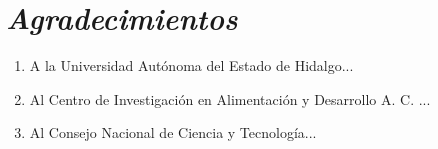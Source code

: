 \newpage
\pagestyle{empty} %

\thispagestyle{empty}

\section*{\centering \huge \it Agradecimientos}
\bigskip

\begin{enumerate}
	\item A la Universidad Autónoma del Estado de Hidalgo...
	\item Al Centro de Investigación en Alimentación y Desarrollo A. C. ...
	\item Al Consejo Nacional de Ciencia y Tecnología...
\end{enumerate}
